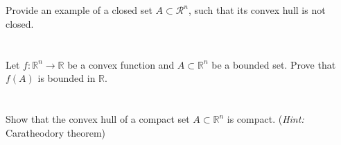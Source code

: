 \documentclass[]{article}
\newcommand{\R}{\mathbb{R}}
\begin{document}
\subsection{}
Provide an example of a closed set $A \subset \mathcal{R}^n$, such that its convex hull is not closed.












\newpage
\section{}
Let $f : \R^n \to \R$ be a convex function and $A \subset \R^n$ be a bounded set.
Prove that $f(A)$ is bounded in $\R$.













\newpage
\section{}
Show that the convex hull of a compact set $A \subset \R^n$ is compact.
(\textit{Hint:} Caratheodory theorem)
\end{document}
